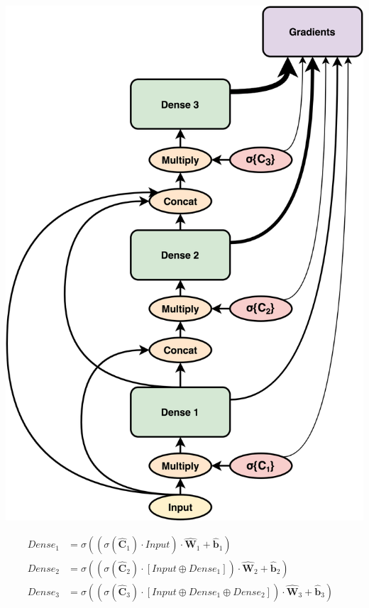 \documentclass{article}
\let\oldhat\hat
\renewcommand{\hat}[1]{\oldhat{\mathbf{#1}}}
\begin{document}
\noindent\begin{minipage}{.45\textwidth}
   \centering
   \includegraphics[scale=0.09]{DSC.png}
   \label{fig:DSC.png}
\end{minipage}
\begin{minipage}{.45\textwidth}
\begin{equation}
\label{eq:dsc_math_representation}
\begin{aligned}
   Dense_{1} &= \sigma((\sigma(\hat{C}_{1}) \cdot Input) \cdot \hat{W}_{1} + \hat{b}_{1}) &\\
   Dense_{2} &= \sigma((\sigma(\hat{C}_{2}) \cdot [Input \oplus Dense_{1}]) \cdot \hat{W}_{2} + \hat{b}_{2}) &\\
   Dense_{3} &= \sigma((\sigma(\hat{C}_{3}) \cdot [Input \oplus Dense_{1} \oplus Dense_{2}]) \cdot \hat{W}_{3} + \hat{b}_{3}) 
\end{aligned}
\end{equation}
\end{minipage}
\end{document}
